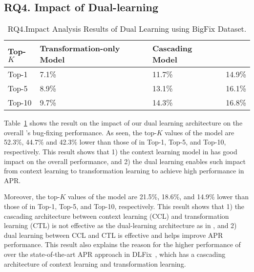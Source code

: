 \subsection{\bf RQ4. Impact of Dual-learning}



\begin{table}[t]
  \caption{RQ4.Impact Analysis Results of Dual Learning using BigFix Dataset.}
  \vspace{-6pt}
	{\small
		\begin{center}
			\renewcommand{\arraystretch}{1}
			\begin{tabular}{p{1cm}<{\centering}|p{2.7cm}<{\centering}|p{1.7cm}<{\centering}|p{1cm}<{\centering}}
				\hline
				Top-$K$ & Transformation-only Model & Cascading Model &  \tool \\			
				\hline
				Top-1   & 7.1\% & 11.7\% & 14.9\% \\ \hline
				Top-5	& 8.9\% & 13.1\% & 16.1\% \\ \hline
				Top-10	& 9.7\% & 14.3\% & 16.8\%\\ \hline
			
				\hline
			\end{tabular}
			\label{fig:rq4_results}
		\end{center}
	}
\end{table}

Table~\ref{fig:rq4_results} shows the result on the impact of our dual
learning architecture on the overall {\tool}'s bug-fixing performance.
As seen, the top-$K$ values of the  model
are 52.3\%, 44.7\% and 42.3\% lower than those of {\tool} in Top-1,
Top-5, and Top-10, respectively. This result shows that 1) the context learning model in {\tool} has good impact on the overall performance, 
and 2) the dual learning enables such impact from context learning to
transformation learning to achieve high performance in APR.

Moreover, the top-$K$ values of the  model are 21.5\%,
18.6\%, and 14.9\% lower than those of {\tool} in Top-1, Top-5, and
Top-10, respectively. This result shows that 1) the cascading
architecture between context learning (CCL) and transformation
learning (CTL) is not effective as the dual-learning architecture as
in {\tool}, and 2) dual learning between CCL and CTL is effective and
helps improve APR performance. This result also explains the reason
for the higher performance of {\tool} over the state-of-the-art APR
approach in DLFix~\cite{icse20}, which has a cascading architecture of
context learning and transformation learning.



